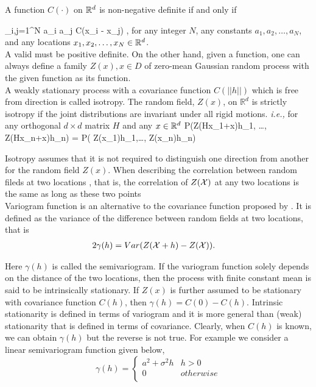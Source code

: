 A function $C(\cdot)$ on $\mathbb{R}^d$ is non-negative definite if and only if

\beq
\label{cov_pd}
\sum_{i,j=1}^{N} a_i a_j C(x_i - x_j) ,
\eeq
for any integer $N$, any constants $a_1, a_2, \ldots, a_N$, and any locations $x_1, x_2, \ldots, x_N \in \mathbb{R}^d$. \\


A valid \cov must be positive definite. On the other hand, given a \pd function, one can always define a family $Z(x), x \in D$ of zero-mean Gaussian random process with the given function as its \cov function. \\

		
A weakly stationary process with a covariance function $C(||h||)$ which is free from direction is called isotropy. The random field, $Z(x)$, on $\mathbb{R}^d$ is strictly isotropy if the joint distributions are invariant under all rigid motions. {\em i.e.,} for any orthogonal $d\times d$ matrix $H$ and any $x\in \mathbb{R}^d$
\beq
P(Z(Hx_1+x)\le h_1, \ldots, Z(Hx_n+x)\le h_n) = P( Z(x_1)\le h_1,\ldots, Z(x_n)\le h_n)
\eeq

Isotropy assumes that it is not required to distinguish one direction from another for the random field $Z(x)$. When describing the correlation between random fileds at two locations , that is, the correlation of $Z(\mathcal{X})$ at any two locations is the same as long as these two points  \\

Variogram function is an alternative to the covariance function proposed by \cite{Matheron1973}. It is defined as the variance of the difference between random fields at two locations, that is
\begin{align}
	2\gamma(h) & = Var(Z(\mathcal{X}+h) -Z(\mathcal{X})).
\end{align}

Here $\gamma(h)$ is called the semivariogram. If the variogram function solely depends on the distance of the two locations, then the process with finite constant mean is said to be intrinsically stationary. If $Z(x)$ is further assumed to be stationary with covariance function $C(h)$, then $\gamma(h) = C(0) - C(h)$. Intrinsic stationarity is defined in terms of variogram and it is more general than (weak) stationarity that is defined in terms of covariance. Clearly, when $C(h)$ is known, we can obtain $\gamma(h)$ but the reverse is not true. For example we consider a linear semivariogram function given below,
\[
	\gamma(h) = \left \{ \begin{array}{cc}
	a^2+\sigma^2h & h>0 \\
	0 & otherwise \\
	\end{array}
	\right.
\]

